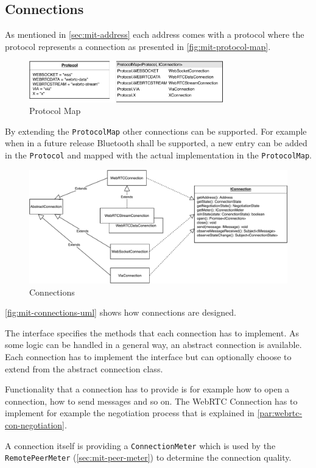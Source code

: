 \subsection{Connections}\label{sec:mit-connections}
As mentioned in \vref{sec:mit-address} each address comes with a protocol where the protocol represents a connection as presented in \vref{fig:mit-protocol-map}.

\begin{figure}
\centering
\includegraphics[width=0.75\textwidth]{graphics/implementation/mitosis-architecture-connections-protocol-map.pdf}
\caption{Protocol Map}
\label{fig:mit-protocol-map}
\end{figure}

By extending the \lstinline|ProtocolMap| other connections can be supported. For example when in a future release Bluetooth shall be supported, a new entry can be added in the \lstinline|Protocol| and mapped with the actual implementation in the \lstinline|ProtocolMap|.

\begin{figure}
\centering
\includegraphics[width=1\textwidth]{graphics/implementation/mitosis-architecture-connections.pdf}
\caption{Connections}
\label{fig:mit-connections-uml}
\end{figure}

\vref{fig:mit-connections-uml} shows how connections are designed.

The interface specifies the methods that each connection has to implement. As some logic can be handled in a general way, an abstract connection is available. Each connection has to implement the interface but can optionally choose to extend from the abstract connection class.

Functionality that a connection has to provide is for example how to open a connection, how to send messages and so on. The WebRTC Connection has to implement for example the negotiation process that is explained in \vref{par:webrtc-con-negotiation}.

A connection itself is providing a \lstinline|ConnectionMeter| which is used by the \lstinline|RemotePeerMeter| (\vref{sec:mit-peer-meter}) to determine the connection quality.